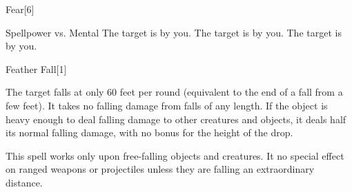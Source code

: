 \begin{spellsection}[Mass]{Fear}[6]
    \begin{spellheader}
    \end{spellheader}
    \begin{spellcontent}
        \begin{spelltargetinginfo}
        \end{spelltargetinginfo}
        \begin{spelleffects}
            \begin{spellattack}{Spellpower vs. Mental}
                \spellsuccess The target is \frightened by you.
                \spellcritical The target is \panicked by you.
                \spellfailure The target is \shaken by you.
            \end{spellattack}
            \spelldur \durshort \dismissable
        \end{spelleffects}
    \end{spellcontent}
    \begin{spellfooter}
        \miscastexplode
    \end{spellfooter}
\end{spellsection}

\begin{spellsection}{Feather Fall}[1]
    \begin{spellheader}
    \end{spellheader}
    \begin{spellcontent}
        \begin{spelltargetinginfo}
        \end{spelltargetinginfo}
        \begin{spelleffects}
            \spelleffect The target falls at only 60 feet per round (equivalent to the end of a fall from a few feet). It takes no falling damage from falls of any length. If the object is heavy enough to deal falling damage to other creatures and objects, it deals half its normal falling damage, with no bonus for the height of the drop.
            \spelldur \durshort
        \end{spelleffects}
    \end{spellcontent}
    \begin{spellfooter}
        \spellnotes This spell works only upon free-falling objects and creatures. It no special effect on ranged weapons or projectiles unless they are falling an extraordinary distance.
        \miscastrandom
    \end{spellfooter}
\end{spellsection}

